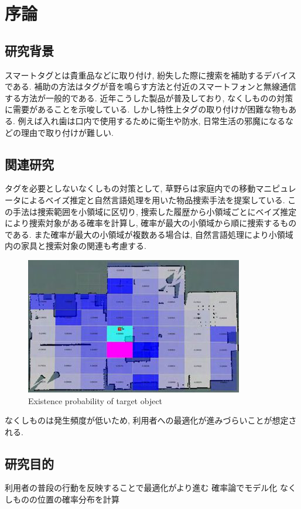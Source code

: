 \chapter{序論}

\section{研究背景}
スマートタグとは貴重品などに取り付け, 紛失した際に捜索を補助するデバイスである. 
補助の方法はタグが音を鳴らす方法と付近のスマートフォンと無線通信する方法が一般的である. 
近年こうした製品が普及しており, なくしものの対策に需要があることを示唆している. 
しかし特性上タグの取り付けが困難な物もある. 
例えば入れ歯は口内で使用するために衛生や防水, 日常生活の邪魔になるなどの理由で取り付けが難しい. 

\section{関連研究}
タグを必要としないなくしもの対策として, 草野らは家庭内での移動マニピュレータによるベイズ推定と自然言語処理を用いた物品捜索手法を提案している. \cite{kusano}
この手法は捜索範囲を小領域に区切り, 捜索した履歴から小領域ごとにベイズ推定により捜索対象がある確率を計算し, 確率が最大の小領域から順に捜索するものである. 
また確率が最大の小領域が複数ある場合は, 自然言語処理により小領域内の家具と捜索対象の関連も考慮する. 

\begin{figure}[H]
    \begin{center}
        \includegraphics[width=0.8\linewidth]{figs/kusano.jpg}
        \caption{Existence probability of target object}
        \label{fig:kusano}
    \end{center}
\end{figure}

なくしものは発生頻度が低いため, 利用者への最適化が進みづらいことが想定される. 

\section{研究目的}
利用者の普段の行動を反映することで最適化がより進む
確率論でモデル化
なくしものの位置の確率分布を計算
